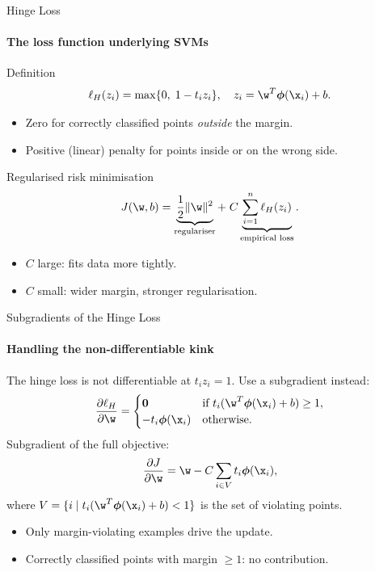 \begin{frame}{Hinge Loss}
  \framesubtitle{The loss function underlying SVMs}
  \begin{block}{Definition}
    \[
      \ell_H(z_i) = \max\{0,\; 1 - t_i z_i\}, \quad z_i = \w^T\boldsymbol{\phi}(\x_i)+b.
    \]
  \end{block}
  \begin{itemize}
    \item Zero for correctly classified points \emph{outside} the margin.
    \item Positive (linear) penalty for points inside or on the wrong side.
  \end{itemize}
  \begin{block}{Regularised risk minimisation}
    \[
      J(\w,b) = \underbrace{\frac{1}{2}\|\w\|^2}_{\text{regulariser}}
      + \; C \underbrace{\sum_{i=1}^n \ell_H(z_i)}_{\text{empirical loss}}.
    \]
  \end{block}
  \begin{itemize}
    \item $C$ large: fits data more tightly.
    \item $C$ small: wider margin, stronger regularisation.
  \end{itemize}
\end{frame}

\begin{frame}{Subgradients of the Hinge Loss}
  \framesubtitle{Handling the non-differentiable kink}
  The hinge loss is \alert{not differentiable} at $t_i z_i = 1$.
  Use a \alert{subgradient} instead:
  \[
    \frac{\partial \ell_H}{\partial \w} =
    \begin{cases}
      \mathbf{0} & \text{if } t_i(\w^T\boldsymbol{\phi}(\x_i)+b) \ge 1, \\
      -t_i \boldsymbol{\phi}(\x_i) & \text{otherwise.}
    \end{cases}
  \]
  Subgradient of the full objective:
  \[
    \frac{\partial J}{\partial \w} = \w - C\sum_{i \in V} t_i \boldsymbol{\phi}(\x_i),
  \]
  where $V = \{i \mid t_i(\w^T\boldsymbol{\phi}(\x_i)+b) < 1\}$ is the set of \alert{violating points}.
  \begin{itemize}
    \item Only margin-violating examples drive the update.
    \item Correctly classified points with margin $\ge 1$: no contribution.
  \end{itemize}
\end{frame}

